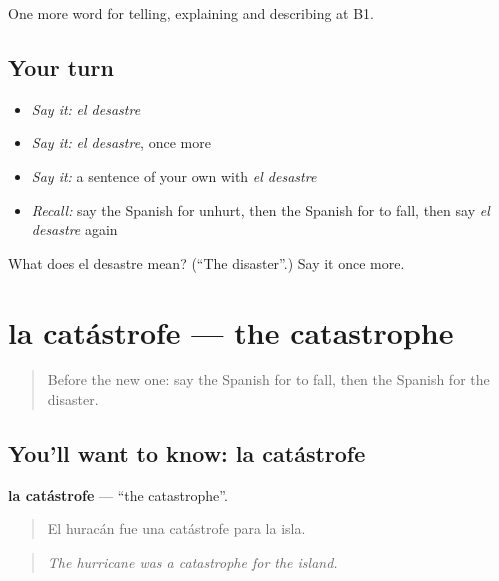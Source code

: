\begin{grammarlens}[title={What you've built}]
One more word for telling, explaining and describing at B1.
\end{grammarlens}

\subsection*{Your turn}
\begin{itemize}
\raggedright
  \item \emph{Say it:} \emph{el desastre}
  \item \emph{Say it:} \emph{el desastre}, once more
  \item \emph{Say it:} a sentence of your own with \emph{el desastre}
  \item \emph{Recall:} say the Spanish for unhurt, then the Spanish for to fall, then say \emph{el desastre} again
\end{itemize}

\begin{tcolorbox}[breakable,colback=teal!4,colframe=teal!35!black,title={Before you move on}]
What does el desastre mean? (\textquotedblleft{}The disaster\textquotedblright{}.) Say it once more.
\end{tcolorbox}
\section[la catástrofe]{la catástrofe — the catastrophe}

\label{lesson:ES-C528-catastrofe}



\begin{quote}
Before the new one: say the Spanish for to fall, then the Spanish for the disaster.
\end{quote}

\subsection*{You'll want to know: la catástrofe}
\textbf{la catástrofe} — \textquotedblleft{}the catastrophe\textquotedblright{}.

\begin{quote}
El huracán fue una catástrofe para la isla.
\end{quote}

\begin{quote}
\emph{The hurricane was a catastrophe for the island.}
\end{quote}

